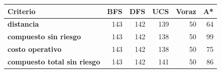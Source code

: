 \renewcommand{\arraystretch}{1.2}
\begin{tabular}{|l|r|r|r|r|r|}
\hline
\rowcolor{gray!20} \textbf{Criterio} & \textbf{BFS} & \textbf{DFS} & \textbf{UCS} & \textbf{Voraz} & \textbf{A*} \\
\hline
\textbf{distancia} & 143 & 142 & 139 & 50 & 64 \\
\hline
\textbf{compuesto sin riesgo} & 143 & 142 & 138 & 50 & 99 \\
\hline
\textbf{costo operativo} & 143 & 142 & 138 & 50 & 75 \\
\hline
\textbf{compuesto total sin riesgo} & 143 & 142 & 141 & 50 & 86 \\
\hline
\end{tabular}
